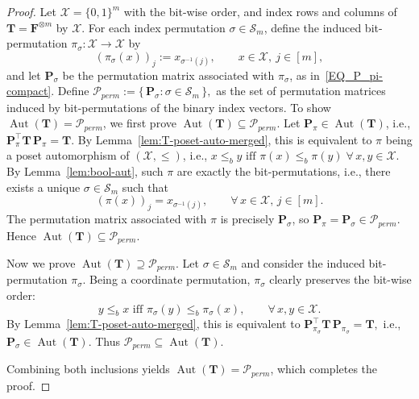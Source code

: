 \documentclass[onecolumn]{IEEEtran} %
\newcommand{\1}{\mathbbm{1}}
\DeclareMathOperator{\Aut}{Aut}
\theoremstyle{boldremark}
\begin{document}
\begin{proof}
Let \(\mathcal{X}=\{0,1\}^m\) with the bit-wise order, and index rows and
columns of \(\mathbf{T}=\mathbf{F}^{\otimes m}\) by \(\mathcal{X}\). For each 
index permutation \(\sigma\in\mathcal{S}_m\), define the induced
bit-permutation \(\pi_\sigma:\mathcal{X}\to\mathcal{X}\) by
\[
  (\pi_\sigma(x))_j := x_{\sigma^{-1}(j)},
  \qquad x\in\mathcal{X},\ j\in[m],
\]
and let \(\mathbf{P}_\sigma\) be the permutation matrix associated with
\(\pi_\sigma\), as in~\eqref{EQ_P_pi-compact}. Define $  \mathcal{P}_{perm}
  := \bigl\{\,\mathbf{P}_\sigma : \sigma\in\mathcal{S}_m\,\bigr\},$ as the set of permutation matrices induced
by bit-permutations of the binary index vectors. To show
\(\Aut(\mathbf{T})=\mathcal{P}_{perm}\), we first prove \(\Aut(\mathbf{T})\subseteq\mathcal{P}_{perm}\). Let \(\mathbf{P}_\pi\in\Aut(\mathbf{T})\), i.e.,
\(
  \mathbf{P}_\pi^{\top}\mathbf{T}\,\mathbf{P}_\pi = \mathbf{T}.
\)
By Lemma~\ref{lem:T-poset-auto-merged}, this is equivalent to \(\pi\) being
a poset automorphism of \((\mathcal{X},\le)\), i.e., $ x\le_b y \mbox{ iff } \pi(x)\le_b \pi(y)  \;\forall\,x,y\in\mathcal{X}.$
By Lemma~\ref{lem:bool-aut}, such \(\pi\) are exactly the bit-permutations,
i.e., there exists a unique \(\sigma\in\mathcal{S}_m\) such that
\[
  (\pi(x))_j = x_{\sigma^{-1}(j)},
  \qquad\forall\,x\in\mathcal{X},\,j\in[m].
\]
The permutation matrix associated with \(\pi\) is precisely
\(\mathbf{P}_\sigma\), so \(\mathbf{P}_\pi=\mathbf{P}_\sigma\in\mathcal{P}_{perm}\).
Hence
\(
  \Aut(\mathbf{T})\subseteq\mathcal{P}_{perm}.
\)

Now we prove \(\Aut(\mathbf{T})\supseteq\mathcal{P}_{perm}\). Let \(\sigma\in\mathcal{S}_m\) and consider the induced
bit-permutation \(\pi_\sigma\). Being a coordinate permutation,
\(\pi_\sigma\) clearly preserves the bit-wise order:
\[
  y\le_b x \mbox{ iff } \pi_\sigma(y)\le_b \pi_\sigma(x),
  \qquad\forall\,x,y\in\mathcal{X}.
\]
By Lemma~\ref{lem:T-poset-auto-merged}, this is equivalent to
\(
  \mathbf{P}_{\pi_\sigma}^{\top}\mathbf{T}\,\mathbf{P}_{\pi_\sigma}
  = \mathbf{T},
\)
i.e., \(\mathbf{P}_\sigma\in\Aut(\mathbf{T})\). Thus
\(
  \mathcal{P}_{perm}\subseteq\Aut(\mathbf{T}).
\)

\medskip
Combining both inclusions yields \(\Aut(\mathbf{T})=\mathcal{P}_{perm}\), which completes the proof. 
\end{proof}
\end{document}
